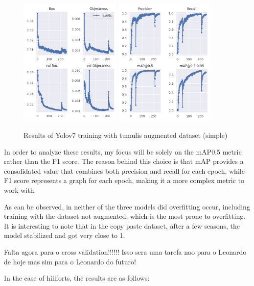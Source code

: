 \begin{figure}[H]
    \centering
    {{\includegraphics[width=5cm]{images/training/mamoas/maia1.png} }}
    \qquad
    {{\includegraphics[width=5cm]{images/training/mamoas/maia2.png} }}
    \caption{Results of Yolov7 training with tumulis augmented dataset (simple)}
    \label{fig:example}
\end{figure}

In order to analyze these results, my focus will be solely on the mAP0.5 metric rather than the F1 score. The reason behind this choice is that mAP provides a consolidated value that combines both precision and recall for each epoch, while F1 score represents a graph for each epoch, making it a more complex metric to work with.

As can be observed, in neither of the three models did overfitting occur, including training with the dataset not augmented, which is the most prone to overfitting. It is interesting to note that in the copy paste dataset, after a few seasons, the model stabilized and got very close to 1.

Falta agora para o cross validation!!!!!!
Isso sera uma tarefa nao para o Leonardo de hoje mas sim para o Leonardo do futuro!

In the case of hillforts, the results are as follows:

